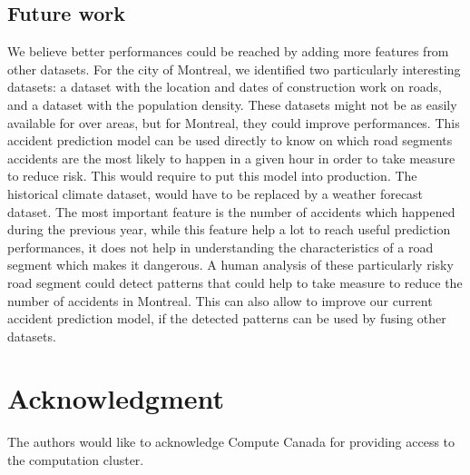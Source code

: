 \documentclass[conference]{IEEEtran}
\begin{document}
\subsection{Future work}
We believe better performances could be reached by adding more features from other datasets.
For the city of Montreal, we identified two particularly interesting datasets: a dataset with the location and dates of construction work on roads, and a dataset with the population density.
These datasets might not be as easily available for over areas, but for Montreal, they could improve performances.
This accident prediction model can be used directly to know on which road segments accidents are the most likely to happen in a given hour in order to take measure to reduce risk.
This would require to put this model into production.
The historical climate dataset, would have to be replaced by a weather forecast dataset.
The most important feature is the number of accidents which happened during the previous year, while this feature help a lot to reach useful prediction performances, it does not help in understanding the characteristics of a road segment which makes it dangerous.
A human analysis of these particularly risky road segment could detect patterns that could help to take measure to reduce the number of accidents in Montreal.
This can also allow to improve our current accident prediction model, if the detected patterns can be used by fusing other datasets.

\section*{Acknowledgment}

The authors would like to acknowledge Compute Canada for providing access to the computation cluster.



\end{document}
